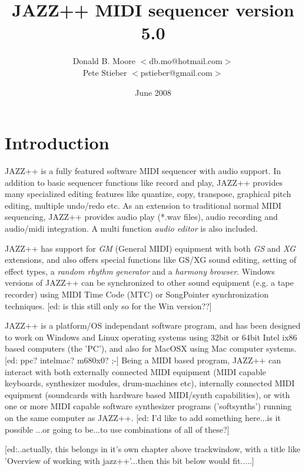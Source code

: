 \documentclass[letterpaper]{report}
\title{JAZZ++ MIDI sequencer version 5.0}
\author{Donald B. Moore  $<$db.mo@hotmail.com$>$\\
Pete Stieber $<$pstieber@gmail.com$>$}
\date{June 2008}
\begin{document}
\maketitle%
\pagestyle{fancyplain}
\tableofcontents%


\chapter{Introduction}\label{introduction}

JAZZ++ is a fully featured software MIDI sequencer with audio support. In
addition to basic sequencer functions like record and play, JAZZ++ provides
many specialized editing features like quantize, copy, transpose, graphical
pitch editing, multiple undo/redo etc. As an extension to traditional normal
MIDI sequencing, JAZZ++ provides audio play (*.wav files), audio recording and
audio/midi integration. A multi function {\em audio editor} is also included.

JAZZ++ has support for {\em GM} (General MIDI) equipment with both {\em GS}
and {\em XG} extensions, and also offers special functions like GS/XG sound
editing, setting of effect types, a {\em random rhythm generator} and a {\em
harmony browser}. Windows versions of JAZZ++ can be synchronized to other sound
equipment (e.g. a tape recorder) using MIDI Time Code (MTC) or SongPointer
synchronization techniques. [ed: is this still only so for the Win version??]

JAZZ++ is a platform/OS independant software program, and has been designed to
work on Windows and Linux operating systems using 32bit or 64bit Intel ix86
based computers (the 'PC'), and also for MacOSX using Mac computer systems. [ed:
ppc? intelmac? m680x0? ;-] Being a MIDI based program, JAZZ++ can interact with
both externally connected MIDI equipment (MIDI capable keyboards, synthesizer
modules, drum-machines etc), internally connected MIDI equipment (soundcards
with hardware based MIDI/synth capabilities), or with one or more MIDI capable
software synthesizer programs ('softsynths') running on the same computer as
JAZZ++. [ed: I'd like to add something here...is it possible ...or going to
be...to use combinations of all of these?]
 


[ed:..actually, this belongs in it's own chapter above trackwindow, with a
title like 'Overview of working with jazz++'...then this bit below would
fit.....]
\end{document}
